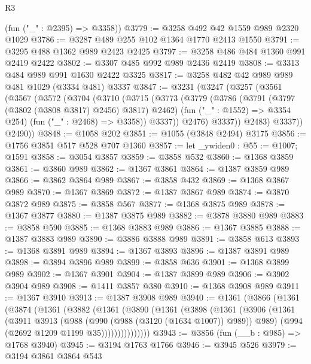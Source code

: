 \begin{lexlean}{R3}
\begin{coremodule}
      (fun ("_" : @2395) => @3358))
@3779 := @3258 @492 @42 @1559 @989 @2320 @1029
@3786 := @3287 @489 @255 @102 @1364 @1770 @2413 @1550
@3791 := @3295 @488 @1362 @989 @2423 @2425
@3797 := @3258 @486 @484 @1360 @991 @2419 @2422
@3802 := @3307 @485 @992 @989 @2436 @2419
@3808 := @3313 @484 @989 @991 @1630 @2422 @3325
@3817 := @3258 @482 @42 @989 @989 @481 @1029 (@3334 @481) @3337
@3847 := @3231
    (@3247
      (@3257
        (@3561
          (@3567
            (@3572
              (@3704
                (@3710
                  (@3715
                    (@3773
                      (@3779
                        (@3786
                          (@3791 (@3797 (@3802 (@3808 @3817) @2456) @3817) @2462)
                          (fun ("_" : @1552) => @3354 @254)
                          (fun ("_" : @2468) => @3358))
                        @3337))
                    @2476)
                  @3337))
              @2483)
            @3337))
        @2490))
@3848 := @1058 @202
@3851 := @1055 (@3848 @2494) @3175
@3856 := @1756 @3851 @517 @528 @707 @1360
@3857 := let _ywiden0 : @55 := @1007; @1591
@3858 := @3054 @3857
@3859 := @3858 @532
@3860 := @1368 @3859
@3861 := @3860 @989
@3862 := @1367 @3861
@3864 := @1387 @3859 @989
@3866 := @3862 @3864 @989
@3867 := @3858 @432
@3869 := @1368 @3867 @989
@3870 := @1367 @3869
@3872 := @1387 @3867 @989
@3874 := @3870 @3872 @989
@3875 := @3858 @567
@3877 := @1368 @3875 @989
@3878 := @1367 @3877
@3880 := @1387 @3875 @989
@3882 := @3878 @3880 @989
@3883 := @3858 @590
@3885 := @1368 @3883 @989
@3886 := @1367 @3885
@3888 := @1387 @3883 @989
@3890 := @3886 @3888 @989
@3891 := @3858 @613
@3893 := @1368 @3891 @989
@3894 := @1367 @3893
@3896 := @1387 @3891 @989
@3898 := @3894 @3896 @989
@3899 := @3858 @636
@3901 := @1368 @3899 @989
@3902 := @1367 @3901
@3904 := @1387 @3899 @989
@3906 := @3902 @3904 @989
@3908 := @1411 @3857 @380
@3910 := @1368 @3908 @989
@3911 := @1367 @3910
@3913 := @1387 @3908 @989
@3940 := @1361
    (@3866
      (@1361
        (@3874
          (@1361
            (@3882
              (@1361
                (@3890
                  (@1361
                    (@3898
                      (@1361
                        (@3906
                          (@1361
                            (@3911
                              @3913
                              (@988 (@990 (@988 (@3120 (@1634 @1007)) @989)) @989)
                              (@994 (@2692 @1209 @1199 @35)))))))))))))))
@3943 := @3856 (fun (__b : @985) => @1768 @3940)
@3945 := @3194 @1763 @1766
@3946 := @3945 @526
@3979 := @3194
    @3861
    @3864
    @543

\end{coremodule}
\end{lexlean}
